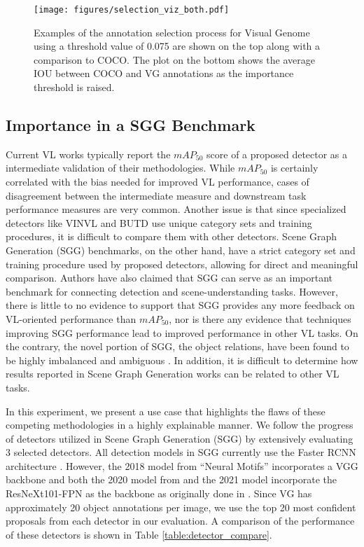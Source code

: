 \documentclass[10pt,twocolumn,letterpaper]{article}
\begin{document}
\begin{figure}[t!]
\centering
\def\svgwidth{\columnwidth}
\texttt{[image: figures/selection\_viz\_both.pdf]}
\caption{Examples of the annotation selection process for Visual Genome using a threshold value of 0.075 are shown on the top along with a comparison to COCO. The plot on the bottom shows the average IOU between COCO and VG annotations as the importance threshold is raised.}
\label{vg-generalize}
\end{figure}
\subsection{Importance in a SGG Benchmark}
Current VL works typically report the $mAP_{50}$ score of a proposed detector as a intermediate validation of their methodologies. While $mAP_{50}$ is certainly correlated with the bias needed for improved VL performance, cases of disagreement between the intermediate measure and downstream task performance measures are very common. Another issue is that since specialized detectors like VINVL \cite{vinvl2021} and BUTD \cite{topbottom2018} use unique category sets and training procedures, it is difficult to compare them with other detectors. Scene Graph Generation (SGG) benchmarks, on the other hand, have a strict category set and training procedure used by proposed detectors, allowing for direct and meaningful comparison. Authors have also claimed that SGG can serve as an important benchmark for connecting detection and scene-understanding tasks. However, there is little to no evidence to support that SGG provides any more feedback on VL-oriented performance than $mAP_{50}$, nor is there any evidence that techniques improving SGG performance lead to improved performance in other VL tasks. On the contrary, the novel portion of SGG, the object relations, have been found to be highly imbalanced and ambiguous \cite{unbiased2020}. In addition, it is difficult to determine how results reported in Scene Graph Generation works can be related to other VL tasks. %
\par
In this experiment, we present a use case that highlights the flaws of these competing methodologies in a highly explainable manner. We follow the progress of detectors utilized in Scene Graph Generation (SGG) by extensively evaluating 3 selected detectors. All detection models in SGG currently use the Faster RCNN architecture \cite{frcnn2015}. However, the 2018 model from ``Neural Motifs'' \cite{motifs2018} incorporates a VGG backbone \cite{vgg2015} and both the 2020 model from \cite{unbiased2020} and the 2021 model \cite{sgg2021} incorporate the ResNeXt101-FPN as the backbone as originally done in \cite{graphical2019}. Since VG has approximately 20 object annotations per image, we use the top 20 most confident proposals from each detector in our evaluation. A comparison of the performance of these detectors is shown in Table \ref{table:detector_compare}.
\end{document}

